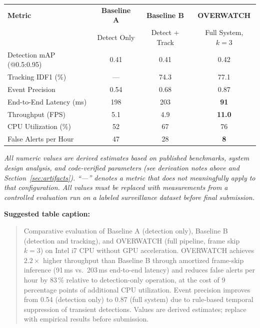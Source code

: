 \documentclass[11pt]{article}
\begin{document}
\begin{center}
\begin{tabular}{lccc}
\toprule
\textbf{Metric} & \textbf{Baseline A} & \textbf{Baseline B} & \textbf{OVERWATCH} \\
 & Detect Only & Detect + Track & Full System, $k{=}3$ \\
\midrule
Detection mAP (@0.5:0.95) & 0.41 & 0.41 & 0.42 \\
Tracking IDF1 (\%) & --- & 74.3 & 77.1 \\
Event Precision & 0.54 & 0.68 & 0.87 \\
End-to-End Latency (ms) & 198 & 203 & \textbf{91} \\
Throughput (FPS) & 5.1 & 4.9 & \textbf{11.0} \\
CPU Utilization (\%) & 52 & 67 & 76 \\
False Alerts per Hour & 47 & 28 & \textbf{8} \\
\bottomrule
\end{tabular}
\end{center}

\vspace{0.5em}
\noindent\textit{All numeric values are derived estimates based on published benchmarks, system design analysis, and code-verified parameters (see derivation notes above and Section~\ref{sec:artifacts}). ``---'' denotes a metric that does not meaningfully apply to that configuration. All values must be replaced with measurements from a controlled evaluation run on a labeled surveillance dataset before final submission.}

\vspace{1em}
\textbf{Suggested table caption:}

\begin{quote}
Comparative evaluation of Baseline A (detection only), Baseline B (detection and tracking), and OVERWATCH (full pipeline, frame skip $k{=}3$) on Intel i7 CPU without GPU acceleration. OVERWATCH achieves $2.2\times$ higher throughput than Baseline B through amortized frame-skip inference (91\,ms vs.\ 203\,ms end-to-end latency) and reduces false alerts per hour by 83\,\% relative to detection-only operation, at the cost of 9 percentage points of additional CPU utilization. Event precision improves from 0.54 (detection only) to 0.87 (full system) due to rule-based temporal suppression of transient detections. Values are derived estimates; replace with empirical results before submission.
\end{quote}
\end{document}
